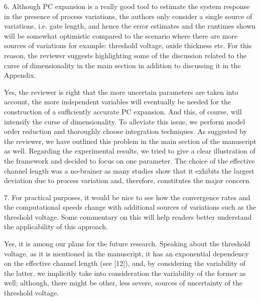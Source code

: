\begin{reviewer}
6. Although PC expansion is a really good tool to estimate the system response in the presence of process variations, the authors only consider a single source of variations, i.e. gate length, and hence the error estimates and the runtimes shown will be somewhat optimistic compared to the scenario where there are more sources of variations for example: threshold voltage, oxide thickness etc. For this reason, the reviewer suggests highlighting some of the discussion related to the curse of dimensionality in the main section in addition to discussing it in the Appendix.
\end{reviewer}
\begin{authors}
Yes, the reviewer is right that the more uncertain parameters are taken into account, the more independent variables will eventually be needed for the construction of a sufficiently accurate PC expansion.
And this, of course, will intensify the curse of dimensionality.
To alleviate this issue, we perform model order reduction and thoroughly choose integration techniques.
As suggested by the reviewer, we have outlined this problem in the main section of the manuscript as well.
Regarding the experimental results, we tried to give a clear illustration of the framework and decided to focus on one parameter.
The choice of the effective channel length was a no-brainer as many studies show that it exhibits the largest deviation due to process variation and, therefore, constitutes the major concern.
\end{authors}

\begin{reviewer}
7. For practical purposes, it would be nice to see how the convergence rates and the computational speeds change with additional sources of variations such as the threshold voltage. Some commentary on this will help readers better understand the applicability of this approach.
\end{reviewer}
\begin{authors}
Yes, it is among our plans for the future research.
Speaking about the threshold voltage, as it is mentioned in the manuscript, it has an exponential dependency on the effective channel length (see [12]), and, by considering the variability of the latter, we implicitly take into consideration the variability of the former as well; although, there might be other, less severe, sources of uncertainty of the threshold voltage.
\end{authors}

